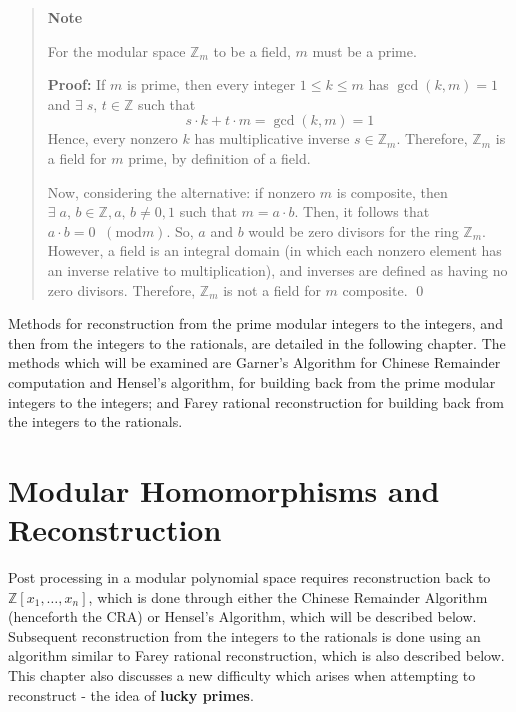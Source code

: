 \documentclass[letterpaper,12pt,titlepage,oneside,final]{book}
\newcounter{notecounter}
\newenvironment{note}{\begin{quote}%
    \refstepcounter{notecounter}%
  \textbf{Note \arabic{notecounter}}%
  \quad
}{%
\end{quote}%
}
\begin{document}
\begin{note}
  For the modular space ${\mathbb{Z}_m}$ to be a field, ${m}$ must be a prime.  

  \textbf{Proof:} If ${m}$ is prime, then every integer ${1 \leq k \leq m}$ has ${\gcd(k, m) = 1}$ and ${\exists \; s, \, t \in \mathbb{Z}}$ such that 
  \begin{equation*}
    s \cdot k + t \cdot m = \gcd(k, m) = 1
  \end{equation*}
  Hence, every nonzero ${k}$ has multiplicative inverse ${s \in \mathbb{Z}_m}$.  Therefore, ${\mathbb{Z}_m}$ is a field for ${m}$ prime, by definition of a field.

  Now, considering the alternative: if nonzero ${m}$ is composite, then ${\exists \; a, \, b \in \mathbb{Z}, a, \, b \neq 0, 1}$ such that ${m = a \cdot b}$.  Then, it follows that ${a \cdot b = 0 \;\;(\textrm{mod} m)}$.  So, ${a}$ and ${b}$ would be zero divisors for the ring ${\mathbb{Z}_m}$.  However, a field is an integral domain (in which each nonzero element has an inverse relative to multiplication), and inverses are defined as having no zero divisors.  Therefore, ${\mathbb{Z}_m}$ is not a field for ${m}$ composite. \qed
\end{note} %

Methods for reconstruction from the prime modular integers to the integers, and then from the integers to the rationals, are detailed in the following chapter.  The methods which will be examined are Garner's Algorithm for Chinese Remainder computation and Hensel's algorithm, for building back from the prime modular integers to the integers; and Farey rational reconstruction for building back from the integers to the rationals.

\chapter{Modular Homomorphisms and Reconstruction}

Post processing in a modular polynomial space requires reconstruction back to ${\mathbb{Z}[x_1, \ldots, x_n]}$, which is done through either the Chinese Remainder Algorithm (henceforth the CRA) or Hensel's Algorithm, which will be described below.  Subsequent reconstruction from the integers to the rationals is done using an algorithm similar to Farey rational reconstruction, which is also described below.  This chapter also discusses a new difficulty which arises when attempting to reconstruct - the idea of \textbf{lucky primes}. 
\end{document}
